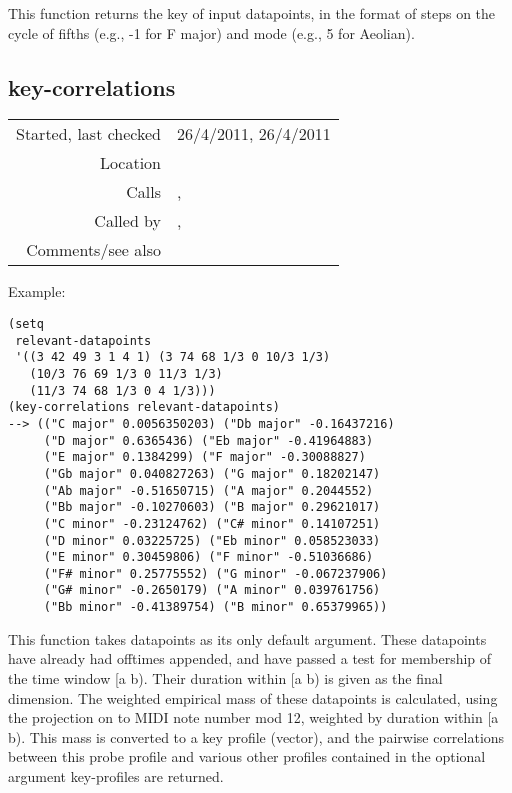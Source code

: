 \noindent This function returns the key of input
datapoints, in the format of steps on the cycle of
fifths (e.g., -1 for F major) and mode (e.g., 5 for
Aeolian).


\subsection*{key-correlations}\label{fun:key-correlations}

\vspace{0.3cm}
\begin{tabular}{r|p{8cm}}
Started, last checked & 26/4/2011, 26/4/2011 \\
Location & \nameref{sec:keyscape} \\
Calls & \nameref{fun:weighted-empirical-mass},\newline \nameref{fun:weighted-mass2key-profile} \\
Called by & \nameref{fun:dataset2pcs-norm-tonic},\newline \nameref{fun:normalised-key-correlations} \\
Comments/see also & 
\end{tabular}

\vspace{0.5cm}
\noindent Example:
\begin{verbatim}
(setq
 relevant-datapoints
 '((3 42 49 3 1 4 1) (3 74 68 1/3 0 10/3 1/3)
   (10/3 76 69 1/3 0 11/3 1/3)
   (11/3 74 68 1/3 0 4 1/3)))
(key-correlations relevant-datapoints)
--> (("C major" 0.0056350203) ("Db major" -0.16437216)
     ("D major" 0.6365436) ("Eb major" -0.41964883)
     ("E major" 0.1384299) ("F major" -0.30088827)
     ("Gb major" 0.040827263) ("G major" 0.18202147)
     ("Ab major" -0.51650715) ("A major" 0.2044552)
     ("Bb major" -0.10270603) ("B major" 0.29621017)
     ("C minor" -0.23124762) ("C# minor" 0.14107251)
     ("D minor" 0.03225725) ("Eb minor" 0.058523033)
     ("E minor" 0.30459806) ("F minor" -0.51036686)
     ("F# minor" 0.25775552) ("G minor" -0.067237906)
     ("G# minor" -0.2650179) ("A minor" 0.039761756)
     ("Bb minor" -0.41389754) ("B minor" 0.65379965))
\end{verbatim}

\noindent This function takes datapoints as its only
default argument. These datapoints have already had
offtimes appended, and have passed a test for
membership of the time window [a b). Their duration
within [a b) is given as the final dimension. The
weighted empirical mass of these datapoints is
calculated, using the projection on to MIDI note
number mod 12, weighted by duration within [a b). This
mass is converted to a key profile (vector), and the
pairwise correlations between this probe profile and
various other profiles contained in the optional
argument key-profiles are returned.


